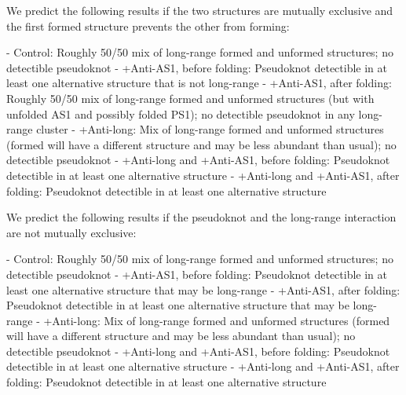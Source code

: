 \documentclass[main.tex]{subfiles}
\begin{document}
We predict the following results if the two structures are mutually exclusive and the first formed structure prevents the other from forming:

- Control: Roughly 50/50 mix of long-range formed and unformed structures; no detectible pseudoknot
- +Anti-AS1, before folding: Pseudoknot detectible in at least one alternative structure that is not long-range
- +Anti-AS1, after folding: Roughly 50/50 mix of long-range formed and unformed structures (but with unfolded AS1 and possibly folded PS1); no detectible pseudoknot in any long-range cluster
- +Anti-long: Mix of long-range formed and unformed structures (formed will have a different structure and may be less abundant than usual); no detectible pseudoknot
- +Anti-long and +Anti-AS1, before folding: Pseudoknot detectible in at least one alternative structure
- +Anti-long and +Anti-AS1, after folding: Pseudoknot detectible in at least one alternative structure

We predict the following results if the pseudoknot and the long-range interaction are not mutually exclusive:

- Control: Roughly 50/50 mix of long-range formed and unformed structures; no detectible pseudoknot
- +Anti-AS1, before folding: Pseudoknot detectible in at least one alternative structure that may be long-range
- +Anti-AS1, after folding: Pseudoknot detectible in at least one alternative structure that may be long-range
- +Anti-long: Mix of long-range formed and unformed structures (formed will have a different structure and may be less abundant than usual); no detectible pseudoknot
- +Anti-long and +Anti-AS1, before folding: Pseudoknot detectible in at least one alternative structure
- +Anti-long and +Anti-AS1, after folding: Pseudoknot detectible in at least one alternative structure
\end{document}
